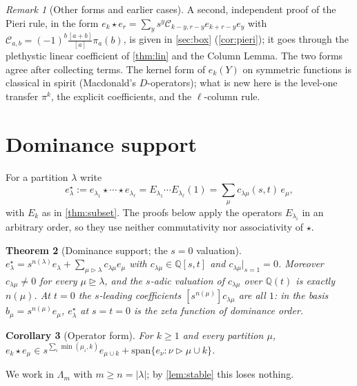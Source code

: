 \documentclass[11pt]{amsart}
\newtheorem{theorem}{Theorem}[section]
\newtheorem{corollary}[theorem]{Corollary}
\theoremstyle{definition}
\theoremstyle{remark}
\newtheorem{remark}[theorem]{Remark}
\numberwithin{equation}{section}
\newcommand{\Lam}{\Lambda}
\begin{document}
\begin{remark}[Other forms and earlier cases]
A second, independent proof of the Pieri rule, in the form $e_k\star e_r=\sum_{y}s^y\mathcal C_{k-y,r-y}e_{k+r-y}e_y$ with $\mathcal C_{a,b}=(-1)^b\frac{[a+b]}{[a]}\pi_a(b)$, is given in \cref{sec:box} (\cref{cor:pieri}); it goes through the plethystic linear coefficient of \cref{thm:lin} and the Column Lemma. The two forms agree after collecting terms. The kernel form of $e_k(Y)$ on symmetric functions is classical in spirit (Macdonald's $D$-operators); what is new here is the level-one transfer $\pi^k$, the explicit coefficients, and the $\ell$-column rule.
\end{remark}

\section{Dominance support}\label{sec:DS}
For a partition $\lambda$ write
\[ e^\star_\lambda:=e_{\lambda_1}\star\cdots\star e_{\lambda_\ell}=E_{\lambda_1}\cdots E_{\lambda_\ell}(1)=\sum_\mu c_{\lambda\mu}(s,t)\,e_\mu , \]
with $E_k$ as in \cref{thm:subset}. The proofs below apply the operators $E_{\lambda_i}$ in an arbitrary order, so they use neither commutativity nor associativity of $\star$.

\begin{theorem}[Dominance support; the $s=0$ valuation]\label{thm:DS}
$e^\star_\lambda=s^{n(\lambda)}e_\lambda+\sum_{\mu\triangleright\lambda}c_{\lambda\mu}e_\mu$ with $c_{\lambda\mu}\in\mathbb{Q}[s,t]$ and $c_{\lambda\mu}|_{s=1}=0$. Moreover $c_{\lambda\mu}\neq0$ for every $\mu\trianglerighteq\lambda$, and the $s$-adic valuation of $c_{\lambda\mu}$ over $\mathbb{Q}(t)$ is exactly $n(\mu)$. At $t=0$ the $s$-leading coefficients $[s^{n(\mu)}]c_{\lambda\mu}$ are all $1$: in the basis $b_\mu=s^{n(\mu)}e_\mu$, $e^\star_\lambda$ at $s=t=0$ is the zeta function of dominance order.
\end{theorem}

\begin{corollary}[Operator form]\label{cor:opDS}
For $k\ge1$ and every partition $\mu$, $e_k\star e_\mu\in s^{\sum_i\min(\mu_i,k)}e_{\mu\cup k}+\mathrm{span}\{e_\nu:\nu\triangleright\mu\cup k\}$.
\end{corollary}

We work in $\Lam_m$ with $m\ge n=|\lambda|$; by \cref{lem:stable} this loses nothing.
\end{document}
